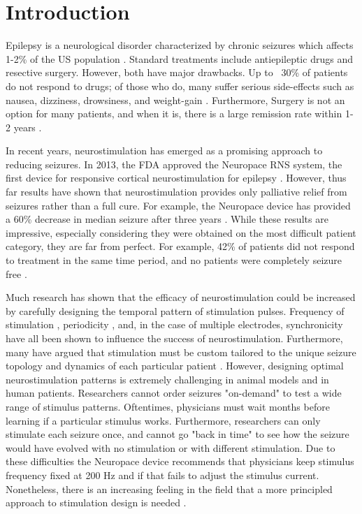 \documentclass[11pt,a4paper,final]{article}
\begin{document}
\section{Introduction \label{intro}}

Epilepsy is a neurological disorder characterized by chronic seizures which affects 1-2\% of the US population \citep{begley00}.
Standard treatments include antiepileptic drugs and resective surgery.
However, both have major drawbacks.
Up to ~30\% of patients do not respond to drugs; of those who do, many suffer serious side-effects such as nausea, dizziness, drowsiness, and weight-gain \citep{brodie96}.
Furthermore, Surgery is not an option for many patients, and when it is, there is a large remission rate within 1-2 years  \citep{engel03}.

In recent years, neurostimulation has emerged as a promising approach to reducing seizures.
In 2013, the FDA approved the Neuropace RNS system, the first device for responsive cortical neurostimulation for epilepsy \citep{sun08}.
However, thus far results have shown that neurostimulation provides only palliative relief from seizures rather than a full cure.
For example, the Neuropace device has provided a 60\% decrease in median seizure after three years  \citep{bergey15,morrell16}.
While these results are impressive, especially considering they were obtained on the most difficult patient category, they are far from perfect.
For example, 42\% of patients did not respond to treatment in the same time period, and no patients were completely seizure free \citep{bergey15}.

Much research has shown that the efficacy of neurostimulation could be increased by carefully designing the temporal pattern of stimulation pulses.
Frequency of stimulation \citep{chkhenkeli97,cordeiro13}, periodicity \autocite{wyckhuys10,buffel14}, and, in the case of multiple electrodes, synchronicity \citep{nelson11,van14} have all been shown to influence the success of neurostimulation.
Furthermore, many have argued that stimulation must be custom tailored to the unique seizure topology and dynamics of each particular patient \citep{holt14,wendling13,taylor15}.
However, designing optimal neurostimulation patterns is extremely challenging in animal models and in human patients.
Researchers cannot order seizures "on-demand" to test a wide range of stimulus patterns.
Oftentimes, physicians must wait months before learning if a particular stimulus works.
Furthermore, researchers can only stimulate each seizure once, and cannot go "back in time" to see how the seizure would have evolved with no stimulation or with different stimulation.
Due to these difficulties the Neuropace device recommends that physicians keep stimulus frequency fixed at 200 Hz and if that fails to adjust the stimulus current.
Nonetheless, there is an increasing feeling in the field that a more principled approach to stimulation design is needed \citep{netoff15}.
\end{document}
